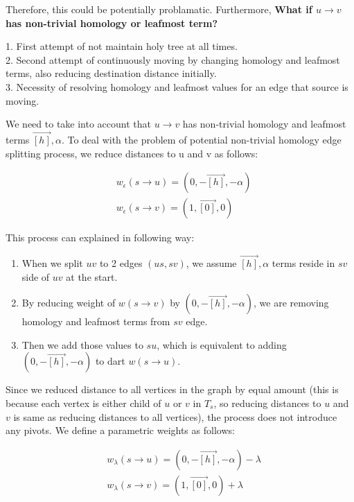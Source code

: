 \documentclass{article}
\begin{document}
Therefore, this could be potentially problamatic. Furthermore, \textbf{What if 
$u \rightarrow v$ has non-trivial homology or leafmost term?}

\begin{center}
{\color{red}
1. First attempt of not maintain holy tree at all times.
\\
2. Second attempt of continuously moving by changing homology and 
leafmost terms, also reducing destination distance initially.
\\ 
3. Necessity of resolving homology and leafmost values for an edge 
that source is moving.}
\end{center}

We need to take into account that $u \rightarrow v$ has non-trivial homology and
leafmost terms $\vec{[h]}, \alpha$. To deal with the problem of potential non-trivial homology edge splitting process,  we reduce distances to u and v as follows:

\begin{align}
& w_{\epsilon}(s \rightarrow u) = ( 0, -\vec{[h]}, -\alpha ) \\ 
& w_{\epsilon}(s \rightarrow v) = ( 1, \vec{[0]}, 0 )
\end{align}

This process can explained in following way: 
\begin{enumerate}
\item When we split $uv$ to 2 edges $(us, sv)$, we assume $\vec{[h]}, \alpha$ terms reside in $sv$ side of $uv$ at the start.
\item By reducing weight of $w(s \rightarrow v) $ by $( 0, -\vec{[h]}, -\alpha )$, we are removing homology and leafmost terms from $sv$ edge.
\item Then we add those values to $su$, which is equivalent to adding  $( 0, -\vec{[h]}, -\alpha )$ to dart $w(s \rightarrow u) $.
\end{enumerate}

Since we reduced distance to all vertices in the graph by equal amount (this is because each vertex is either child of $u$ or $v$ in $T_s$, so reducing distances to $u$ and $v$ is same as reducing distances to all vertices), the process does
not introduce any pivots. We define a parametric weights as follows:

\begin{align}
& w_{\lambda}(s \rightarrow u) = ( 0, -\vec{[h]}, -\alpha ) - \lambda \\
& w_{\lambda}(s \rightarrow v) = ( 1, \vec{[0]}, 0 )  + \lambda 
\end{align}
\end{document}
